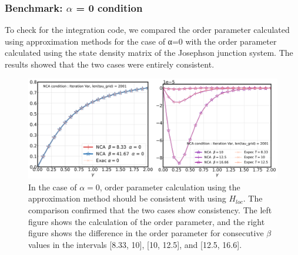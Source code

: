 \documentclass{article}[12pt]
\begin{document}
\begin{spacing}{1.3}
\subsubsection*{Benchmark: $\alpha$ = 0 condition}
To check for the integration code, we compared the order parameter calculated using approximation methods for the case of α=0 
with the order parameter calculated using the state density matrix of the Josephson junction system. 
The results showed that the two cases were entirely consistent.
\begin{figure}[H]
  \centerline{\includegraphics[width=13cm]{TexFigure/4/4_1_03_zero.png}}
  \caption{In the case of $\alpha = 0$, order parameter calculation using the approximation method should be consistent with using $H_{loc}$.
  The comparison confirmed that the two cases show consistency. The left figure shows the calculation of the order parameter, 
  and the right figure shows the difference in the order parameter for consecutive $\beta$ values
  in the intervals [8.33, 10], [10, 12.5], and [12.5, 16.6].}
 \end{figure}
\pagebreak

\end{spacing}
\end{document}
